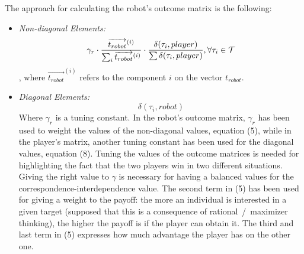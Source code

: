 The approach for calculating the robot's outcome matrix is the following:
\begin{itemize}
\item \textit{Non-diagonal Elements:}\\

\begin{equation}
\gamma_r \cdot \frac{\overrightarrow{t_{robot}}^{(i)}}{\sum_{i}{\overrightarrow{t_{robot}}^{(i)}}} \cdot \frac{\delta(\tau_{i},player)}{\sum{\delta(\tau_{i},player)}}, \forall\tau_{i} \in \mathcal{T}\\ 
\end{equation}
, where $\overrightarrow{t_{robot}}^{(i)}$ refers to the component $i$ on the vector $t_{robot}$.
\item \textit{Diagonal Elements:}
\begin{equation}
\delta(\tau_{i},robot)
\end{equation}
Where $\gamma_r$ is a tuning constant. In the robot's outcome matrix, $\gamma_r$ has been used to weight the values of the non-diagonal values, equation (5), while in the player's matrix, another tuning constant has been used for the diagonal values, equation (8). Tuning the values of the outcome matrices is needed for highlighting the fact that the two players win in two different situations. Giving the right value to $\gamma$ is necessary for having a balanced values for the correspondence-interdependence value.
The second term in (5) has been used for giving a weight to the payoff: the more an individual is interested in a given target (supposed that this is a consequence of rational~/~maximizer thinking), the higher the payoff is if the player can obtain it.
The third and last term in (5) expresses how much advantage the player has on the other one.

\end{itemize}
